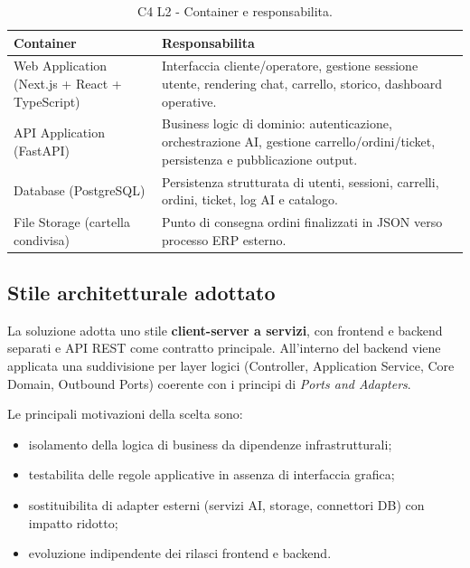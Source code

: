 \documentclass[a4paper, 11pt, oneside]{scrartcl}
\begin{document}
\begin{table}[H]
    \centering
    \renewcommand{\arraystretch}{1.2}
    \begin{tabularx}{\textwidth}{@{}lL@{}}
        \toprule
        \textbf{Container} & \textbf{Responsabilita} \\
        \midrule
        Web Application (Next.js + React + TypeScript) & Interfaccia cliente/operatore, gestione sessione utente, rendering chat, carrello, storico, dashboard operative. \\
        API Application (FastAPI) & Business logic di dominio: autenticazione, orchestrazione AI, gestione carrello/ordini/ticket, persistenza e pubblicazione output. \\
        Database (PostgreSQL) & Persistenza strutturata di utenti, sessioni, carrelli, ordini, ticket, log AI e catalogo. \\
        File Storage (cartella condivisa) & Punto di consegna ordini finalizzati in JSON verso processo ERP esterno. \\
        \bottomrule
    \end{tabularx}
    \caption{C4 L2 - Container e responsabilita.}
\end{table}

\subsection{Stile architetturale adottato}
La soluzione adotta uno stile \textbf{client-server a servizi}, con frontend e backend separati e API REST come contratto principale.
All'interno del backend viene applicata una suddivisione per layer logici (Controller, Application Service, Core Domain, Outbound Ports) coerente con i principi di \textit{Ports and Adapters}.

Le principali motivazioni della scelta sono:
\begin{itemize}
    \item isolamento della logica di business da dipendenze infrastrutturali;
    \item testabilita delle regole applicative in assenza di interfaccia grafica;
    \item sostituibilita di adapter esterni (servizi AI, storage, connettori DB) con impatto ridotto;
    \item evoluzione indipendente dei rilasci frontend e backend.
\end{itemize}

\newpage
\end{document}
